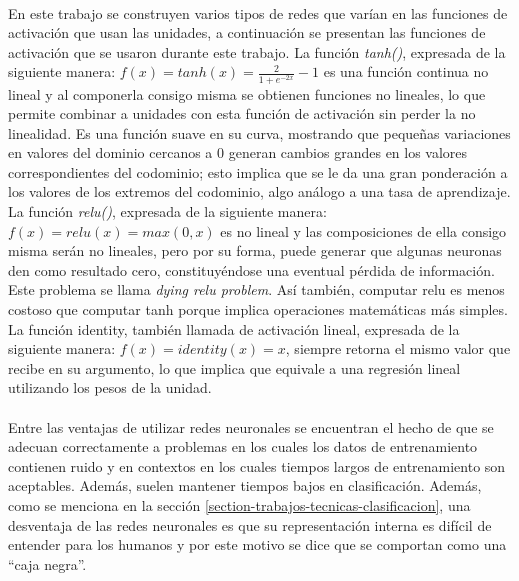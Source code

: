 \paragraph{}En este trabajo se construyen varios tipos de redes que varían en las funciones de activación que usan las unidades, a continuación se presentan las funciones de activación que se usaron durante este trabajo. La función \textit{tanh()}, expresada de la siguiente manera: $f(x) = tanh(x) = \frac{2}{1 + e^{-2x}} - 1 $ es una función continua no lineal y al componerla consigo misma se obtienen funciones no lineales, lo que permite combinar a unidades con esta función de activación sin perder la no linealidad. Es una función suave en su curva, mostrando que pequeñas variaciones en valores del dominio cercanos a 0 generan cambios grandes en los valores correspondientes del codominio; esto implica que se le da una gran ponderación a los valores de los extremos del codominio, algo análogo a una tasa de aprendizaje. La función \textit{relu()}, expresada de la siguiente manera: $f(x) = relu(x) = max(0, x)$ es no lineal y las composiciones de ella consigo misma serán no lineales, pero por su forma, puede generar que algunas neuronas den como resultado cero, constituyéndose una eventual pérdida de información. Este problema se llama \textit{dying relu problem}. Así también, computar relu es menos costoso que computar tanh porque implica operaciones matemáticas más simples. La función identity, también llamada de activación lineal, expresada de la siguiente manera: $f(x) = identity(x) = x$, siempre retorna el mismo valor que recibe en su argumento, lo que implica que equivale a una regresión lineal utilizando los pesos de la unidad.

\paragraph{}Entre las ventajas de utilizar redes neuronales se encuentran el hecho de que se adecuan correctamente a problemas en los cuales los datos de entrenamiento contienen ruido y en contextos en los cuales tiempos largos de entrenamiento son aceptables. Además, suelen mantener tiempos bajos en clasificación. Además, como se menciona en la sección \ref{section-trabajos-tecnicas-clasificacion}, una desventaja de las redes neuronales es que su representación interna es difícil de entender para los humanos y por este motivo se dice que se comportan como una “caja negra”.